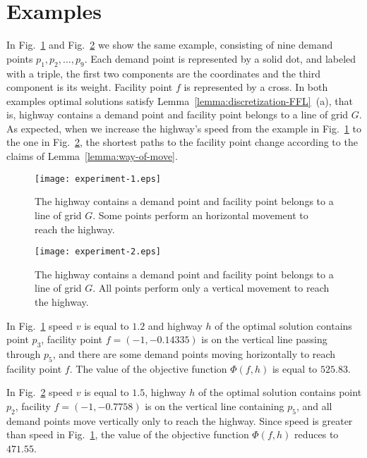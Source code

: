 \documentclass[11pt,a4paper,oneside,onecolumn]{article}
\begin{document}
\section{Examples}\label{section:experimental}

In Fig.~\ref{fig:experiment1} and Fig.~\ref{fig:experiment2} we show
the same example, consisting of nine demand points
$p_1,p_2,\ldots,p_9$. Each demand point is represented by a solid
dot, and labeled with a triple, the first two components are the
coordinates and the third component is its weight. Facility point
$f$ is represented by a cross. In both examples optimal solutions
satisfy Lemma~\ref{lemma:discretization-FFL}~(a), that is, highway
contains a demand point and facility point belongs to a line of grid
$G$. As expected, when we increase the highway's speed from the
example in Fig.~\ref{fig:experiment1} to the one in
Fig.~\ref{fig:experiment2}, the shortest paths to the facility
point change according to the claims of
Lemma~\ref{lemma:way-of-move}.
\begin{figure}[h]
  \centering
  \texttt{[image: experiment-1.eps]}
  \caption{\small{The highway contains a demand point and facility point belongs
  to a line of grid $G$. Some points perform an horizontal movement to reach the
highway.}}
  \label{fig:experiment1}
\end{figure}

\begin{figure}[h]
  \centering
  \texttt{[image: experiment-2.eps]}
  \caption{\small{The highway contains a demand point and facility point belongs
  to a line of grid $G$. All points perform only a vertical movement to reach the
highway.}}
  \label{fig:experiment2}
\end{figure}

In Fig.~\ref{fig:experiment1} speed $v$ is equal to $1.2$ and
highway $h$ of the optimal solution contains point $p_3$, facility
point $f=(-1,-0.14335)$ is on the vertical line passing through
$p_5$, and there are some demand points moving horizontally to reach
facility point $f$. The value of the objective function $\Phi(f,h)$
is equal to $525.83$.

In Fig.~\ref{fig:experiment2} speed $v$ is equal to $1.5$, highway
$h$ of the optimal solution contains point $p_2$, facility
$f=(-1,-0.7758)$ is on the vertical line containing $p_5$, and all
demand points move vertically only to reach the highway. Since speed
is greater than speed in Fig.~\ref{fig:experiment1}, the value of
the objective function $\Phi(f,h)$ reduces to $471.55$.
\end{document}
